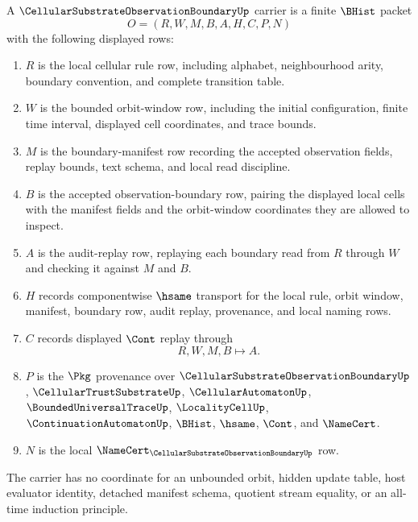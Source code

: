 \begin{definition}
\label{def:cellular-substrate-observation-boundary-carrier}
A $\CellularSubstrateObservationBoundaryUp$ carrier is a finite $\BHist$ packet
$$
O=(R,W,M,B,A,H,C,P,N)
$$
with the following displayed rows:
\begin{enumerate}
\item $R$ is the local cellular rule row, including alphabet, neighbourhood arity, boundary convention, and complete transition table.
\item $W$ is the bounded orbit-window row, including the initial configuration, finite time interval, displayed cell coordinates, and trace bounds.
\item $M$ is the boundary-manifest row recording the accepted observation fields, replay bounds, text schema, and local read discipline.
\item $B$ is the accepted observation-boundary row, pairing the displayed local cells with the manifest fields and the orbit-window coordinates they are allowed to inspect.
\item $A$ is the audit-replay row, replaying each boundary read from $R$ through $W$ and checking it against $M$ and $B$.
\item $H$ records componentwise $\hsame$ transport for the local rule, orbit window, manifest, boundary row, audit replay, provenance, and local naming rows.
\item $C$ records displayed $\Cont$ replay through
$$
R,W,M,B \longmapsto A .
$$
\item $P$ is the $\Pkg$ provenance over $\CellularSubstrateObservationBoundaryUp$, $\CellularTrustSubstrateUp$, $\CellularAutomatonUp$, $\BoundedUniversalTraceUp$, $\LocalityCellUp$, $\ContinuationAutomatonUp$, $\BHist$, $\hsame$, $\Cont$, and $\NameCert$.
\item $N$ is the local $\NameCert_{\CellularSubstrateObservationBoundaryUp}$ row.
\end{enumerate}
The carrier has no coordinate for an unbounded orbit, hidden update table, host evaluator identity, detached manifest schema, quotient stream equality, or an all-time induction principle.
\end{definition}

